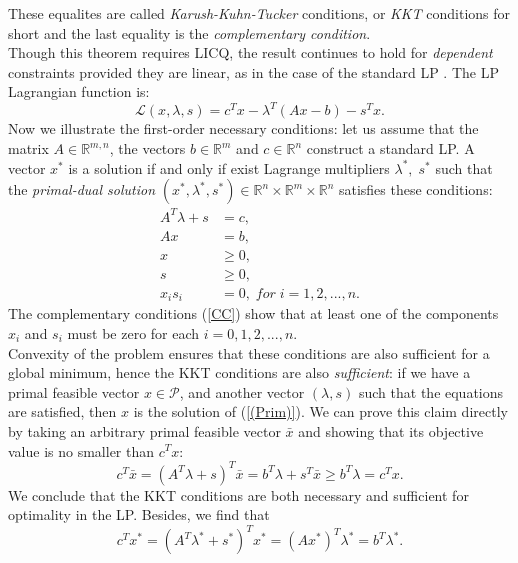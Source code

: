 \documentclass[a4paper,10 pt,titlepage,twoside]{book}
\theoremstyle{plain}
\theoremstyle{definition}
\theoremstyle{remark}
\begin{document}
These equalites are called \textit{Karush-Kuhn-Tucker} conditions, or \textit{KKT} conditions for short and the last equality is the \textit{complementary condition}.\\ Though this theorem requires LICQ, the result continues to hold for \textit{dependent} constraints provided they are linear, as in the case of the standard LP \cite{W}. The LP Lagrangian function is:\\
\begin{equation}\label{Lagrangian}
\mathcal{L}(x,\lambda,s)=c^{T}x-\lambda^{T}\left(Ax-b\right)-s^{T}x.
\end{equation}
Now we illustrate the first-order necessary conditions: let us assume that the matrix $A\in\mathbb{R}^{m,n}$, the vectors $b\in\mathbb{R}^{m}$ and $c\in\mathbb{R}^{n}$ construct a standard LP. A vector $x^{*}$ is a solution if and only if exist Lagrange multipliers $\lambda^{*},\;s^{*}$ such that the \textit{primal-dual solution} $\left( x^{*},\lambda^{*},s^{*}\right)\in\mathbb{R}^{n}\times\mathbb{R}^{m}\times\mathbb{R}^{n}$ satisfies these conditions: 
\begin{align}
A^{T}\lambda+s&=c,\tag{2.5a}\\ \label{DF}
Ax&=b,\tag{2.5b}\\ \label{PF}
x&\geq 0,\tag{2.5c}\\
s&\geq 0,\tag{2.5d}\\
x_{i}s_{i}&=0,\; for\;i= 1,2,...,n.\label{CC} \tag{2.5e}
\end{align} 
The complementary conditions (\ref{CC}) show that at least one of the components $x_{i}$ and $s_{i}$ must be zero for each $i=0,1,2,...,n$.\\
 Convexity of the problem ensures that these conditions are also sufficient for a global minimum, hence the KKT conditions are also \textit{sufficient}: if we have a primal feasible vector $x\in\mathcal{P}$, and another vector $(\lambda, s)$ such that the equations are satisfied, then $x$ is the solution of (\ref{(Prim)}). We can prove this claim directly by taking an arbitrary primal feasible vector $\bar{x}$ and showing that its objective value is no smaller than $c^{T}x$:
\begin{equation*}
c^{T}\bar{x}=(A^{T}\lambda+s)^{T}\bar{x}=b^{T}\lambda+s^{T}\bar{x}\geq b^{T}\lambda= c^{T}x.
\end{equation*}
We conclude that the KKT conditions are both necessary and sufficient for optimality in the LP. Besides, we find that
\begin{equation*}
	c^{T}x^{*}=\left(A^{T}\lambda^{*}+s^{*}\right)^{T}x^{*}=\left(Ax^{*}\right)^{T}\lambda^{*}=b^{T}\lambda^{*}.
\end{equation*}
\end{document}
